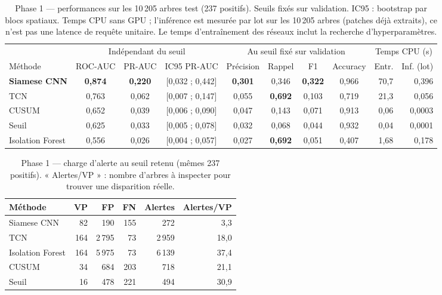 \documentclass[10pt,a4paper,twocolumn]{article}
\begin{document}
\begin{table}[t]
\centering\small
\caption{Phase 1 --- performances sur les 10\,205 arbres test (237 positifs). Seuils fixés sur validation. IC95 : bootstrap par
blocs spatiaux. Temps CPU sans GPU ; l'inférence est mesurée par lot sur les 10\,205 arbres (patches déjà extraits), ce n'est pas
une latence de requête unitaire. Le temps d'entraînement des réseaux inclut la recherche d'hyperparamètres.}
\label{tab:main}
\begin{tabular}{@{}l cc c ccc c rr@{}}
\toprule
& \multicolumn{3}{c}{Indépendant du seuil} & \multicolumn{4}{c}{Au seuil fixé sur validation} & \multicolumn{2}{c}{Temps CPU (s)} \\
\cmidrule(lr){2-4}\cmidrule(lr){5-8}\cmidrule(lr){9-10}
Méthode & ROC-AUC & PR-AUC & IC95 PR-AUC & Précision & Rappel & F1 & Accuracy & Entr. & Inf. (lot) \\
\midrule
\textbf{Siamese CNN} & \textbf{0,874} & \textbf{0,220} & [0,032 ; 0,442] & \textbf{0,301} & 0,346 & \textbf{0,322} & 0,966 & 70,7 & 0,396 \\
TCN & 0,763 & 0,062 & [0,007 ; 0,147] & 0,055 & \textbf{0,692} & 0,103 & 0,719 & 21,3 & 0,056 \\
CUSUM & 0,652 & 0,039 & [0,006 ; 0,090] & 0,047 & 0,143 & 0,071 & 0,913 & 0,06 & 0,0003 \\
Seuil & 0,625 & 0,033 & [0,005 ; 0,078] & 0,032 & 0,068 & 0,044 & 0,932 & 0,04 & 0,0001 \\
Isolation Forest & 0,556 & 0,026 & [0,004 ; 0,057] & 0,027 & \textbf{0,692} & 0,051 & 0,407 & 1,68 & 0,178 \\
\bottomrule
\end{tabular}
\end{table}

\begin{table}[t]
\centering\small
\caption{Phase 1 --- charge d'alerte au seuil retenu (mêmes 237 positifs). « Alertes/VP » : nombre d'arbres à inspecter pour
trouver une disparition réelle.}
\label{tab:burden}
\setlength{\tabcolsep}{3.5pt}
\begin{tabular}{@{}lrrrrr@{}}
\toprule
Méthode & VP & FP & FN & Alertes & Alertes/VP \\
\midrule
Siamese CNN & 82 & 190 & 155 & 272 & 3,3 \\
TCN & 164 & 2\,795 & 73 & 2\,959 & 18,0 \\
Isolation Forest & 164 & 5\,975 & 73 & 6\,139 & 37,4 \\
CUSUM & 34 & 684 & 203 & 718 & 21,1 \\
Seuil & 16 & 478 & 221 & 494 & 30,9 \\
\bottomrule
\end{tabular}
\end{table}
\end{document}
